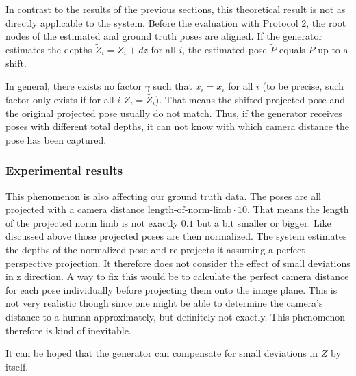 In contrast to the results of the previous sections, this theoretical result is not as directly applicable to the system.
Before the evaluation with Protocol 2, the root nodes of the estimated and ground truth poses are aligned.
If the generator estimates the depths $\widetilde{Z}_i = Z_i + dz$ for all $i$, the estimated pose $\widetilde{P}$ equals $P$ up to a shift.


In general, there exists no factor $\gamma$ such that $x_i = \widetilde{x_i}$ for all $i$ (to be precise, such factor only exists if for all $i$ $Z_i = \widetilde{Z_i}$).
That means the shifted projected pose and the original projected pose usually do not match.
Thus, if the generator receives poses with different total depths, it can not know with which camera distance the pose has been captured.


\subsubsection{Experimental results}
\label{sec:error-on-shift-experimental}

This phenomenon is also affecting our ground truth data. The poses are all projected with a camera distance $ \text{length-of-norm-limb} \cdot 10$. 
That means the length of the projected norm limb is not exactly $0.1$ but a bit smaller or bigger. 
Like discussed above those projected poses are then normalized. 
The system estimates the depths of the normalized pose and re-projects it assuming a perfect perspective projection. 
It therefore does not consider the effect of small deviations in z direction.
A way to fix this would be to calculate the perfect camera distance for each pose individually before projecting them onto the image plane.
This is not very realistic though since one might be able to determine the camera's distance to a human approximately, but definitely not exactly. This phenomenon therefore is kind of inevitable.

It can be hoped that the generator can compensate for small deviations in $Z$ by itself.
